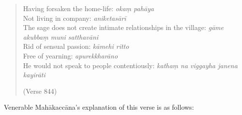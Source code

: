 
\begin{verse}
Having forsaken the home-life: \textit{okaṃ pahāya}\\
Not living in company: \textit{aniketasārī}\\
The sage does not create intimate relationships in the village: \textit{gāme akubbaṃ muni satthavāni}\\
Rid of sensual passion: \textit{kāmehi ritto}\\
Free of yearning: \textit{apurekkharāno}\\
He would not speak to people contentiously: \textit{kathaṃ na viggayha janena kayirāti}

(Verse 844)
\end{verse}

Venerable Mahākaccāna's explanation of this verse is as follows:

